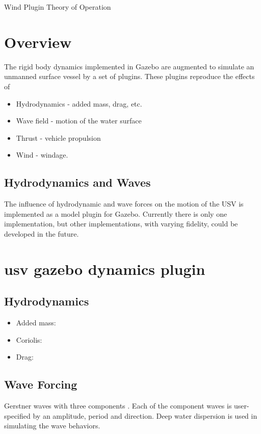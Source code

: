 \documentclass[11pt]{article}
\newcommand{\doctitle}{Wind Plugin Theory of Operation}
\begin{document}
\newpage
\setcounter{page}{1}
\begin{center}
{\huge \doctitle}
\end{center}


\section{Overview}
The rigid body dynamics implemented in Gazebo are augmented to simulate an unmanned surface vessel by a set of plugins.  These plugins reproduce the effects of
\begin{itemize}
\item Hydrodynamics - added mass, drag, etc.
\item Wave field - motion of the water surface
\item Thrust - vehicle propulsion
\item Wind - windage.
  \end{itemize}

\subsection{Hydrodynamics and Waves}
The influence of hydrodynamic and wave forces on the motion of the USV is implemented as a model plugin for Gazebo.  Currently there is only one implementation, but other implementations, with varying fidelity, could be developed in the future.

\section{usv gazebo dynamics plugin}

\subsection{Hydrodynamics}

\begin{itemize}
\item Added mass:
\item Coriolis:
\item Drag:
\end{itemize}

\subsection{Wave Forcing}

Gerstner waves with three components \cite{tessendorf99simulating}.  Each of the component waves is user-specified by an amplitude, period and direction.  Deep water dispersion is used in simulating the wave behaviors.
\end{document}
